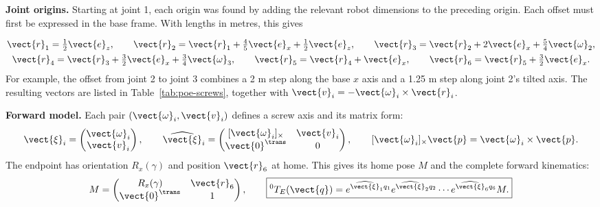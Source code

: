\textbf{Joint origins.}
Starting at joint 1, each origin was found by adding the relevant robot
dimensions to the preceding origin. Each offset must first be expressed
in the base frame. With lengths in metres, this gives
\par
\begin{equation}
 \begin{gathered}
 \vect{r}_1=\tfrac12\vect{e}_z,\qquad
 \vect{r}_2=\vect{r}_1+\tfrac45\vect{e}_x+\tfrac12\vect{e}_z,\qquad
 \vect{r}_3=\vect{r}_2+2\vect{e}_x+\tfrac54\vect{\omega}_2,\\
 \vect{r}_4=\vect{r}_3+\tfrac32\vect{e}_x+\tfrac34\vect{\omega}_3,\qquad
 \vect{r}_5=\vect{r}_4+\vect{e}_x,\qquad
 \vect{r}_6=\vect{r}_5+\tfrac32\vect{e}_x.
 \end{gathered}
 \label{eq:poe-origins}
\end{equation}
For example, the offset from joint 2 to joint 3 combines a 2 m step along
the base $x$ axis and a 1.25 m step along joint 2's tilted axis.
The resulting vectors are listed in Table~\ref{tab:poe-screws}, together
with $\vect{v}_i=-\vect{\omega}_i\times\vect{r}_i$.

\textbf{Forward model.}
Each pair $(\vect{\omega}_i,\vect{v}_i)$ defines a screw axis and its matrix form:
\begin{equation}
 \vect{\xi}_i=\begin{pmatrix}\vect{\omega}_i\\\vect{v}_i\end{pmatrix},\qquad
 \widehat{\vect{\xi}}_i=\begin{pmatrix}[\vect{\omega}_i]_\times&\vect{v}_i\\\vect{0}^\trans&0\end{pmatrix},
 \qquad [\vect{\omega}_i]_\times\vect{p}=\vect{\omega}_i\times\vect{p}.
 \label{eq:poe-screw}
\end{equation}
The endpoint has orientation $R_x(\gamma)$ and position $\vect{r}_6$ at home.
This gives its home pose $M$ and the complete forward kinematics:
\begin{equation}
 M=\begin{pmatrix}R_x(\gamma)&\vect{r}_6\\\vect{0}^\trans&1\end{pmatrix},\qquad
 \boxed{{}^0T_E(\vect{q})=e^{\widehat{\vect{\xi}}_1q_1}e^{\widehat{\vect{\xi}}_2q_2}
 \cdots e^{\widehat{\vect{\xi}}_6q_6}M.}
 \label{eq:poe-fk}
\end{equation}
\par
\endgroup
